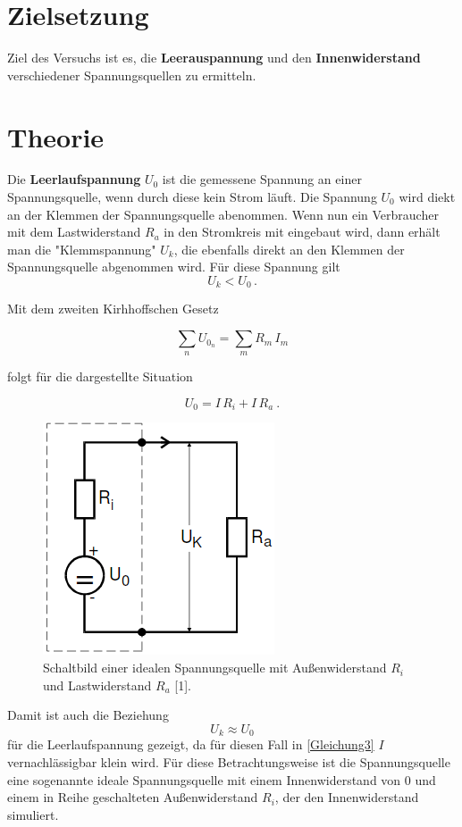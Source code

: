 \section{Zielsetzung}
Ziel des Versuchs ist es, die \textbf{Leerauspannung} und den \textbf{Innenwiderstand} verschiedener
Spannungsquellen zu ermitteln.

\section{Theorie}
Die \textbf{Leerlaufspannung} $U_0$ ist die gemessene Spannung an einer Spannungsquelle, wenn durch diese
kein Strom läuft. Die Spannung $U_0$ wird diekt an der Klemmen der Spannungsquelle abenommen.
Wenn nun ein Verbraucher mit dem Lastwiderstand $R_a$ in den Stromkreis mit eingebaut wird, dann
erhält man die "Klemmspannung" $U_k$, die ebenfalls direkt an den Klemmen der Spannungsquelle abgenommen wird.
Für diese Spannung gilt
\begin{equation*}
  U_k < U_0 \, .
  \label{Gleichung1}
\end{equation*}

 Mit dem zweiten Kirhhoffschen Gesetz

 \begin{equation*}
   \sum_n U_{0_n} = \sum_m R_m \, I_m
   \label{Gleichung2}
 \end{equation*}

 folgt für die dargestellte Situation

 \begin{equation*}
     U_0 = I \, R_i + I \, R_a \ .
     \label{Gleichung3}
 \end{equation*}

 \begin{figure}[h]
   \centering
   \includegraphics[scale = 0.5]{Bild3.png}
   \caption{Schaltbild einer idealen Spannungsquelle mit Außenwiderstand $R_i$ und
   Lastwiderstand $R_a$ [1]. }
   \label{Abb1}
 \end{figure}
\newpage
 Damit ist auch die Beziehung
 \begin{equation*}
     U_k \approx U_0
 \end{equation*}
 für die Leerlaufspannung gezeigt, da für diesen Fall in \eqref{Gleichung3}
 $I$ vernachlässigbar klein wird. Für diese Betrachtungsweise ist die Spannungsquelle
 eine sogenannte ideale Spannungsquelle mit einem Innenwiderstand von 0 und einem in
 Reihe geschalteten Außenwiderstand $R_i$, der den Innenwiderstand simuliert.

